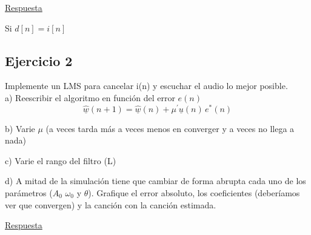 	\underline{\Large{Respuesta}}\\
	
	Si $d[n]=i[n]$ 
	

\subsection{Ejercicio 2}
	Implemente un LMS para cancelar i(n) y escuchar el audio lo mejor posible.\\
	a) Reescribir el algoritmo en función del error $e(n)$
		\begin{equation*}
			\underline{\hat{w}}(n+1) = \underline{\hat{w}}(n) + \mu^{'} \underline{u}(n)\, e^{*}(n)
		\end{equation*}

	b) Varie $\mu$ (a veces tarda más a veces menos en converger y a veces no llega a nada)
	
	c) Varie el rango del filtro (L)
	
	d) A mitad de la simulación tiene que cambiar de forma abrupta cada uno de los parámetros ($A_0$ $\omega_0$ y $\theta$). Grafique el error absoluto, los coeficientes (deberíamos ver que convergen) y la canción con la canción estimada.


	\underline{\Large{Respuesta}}\\

	
